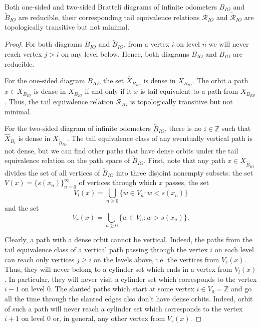 \documentclass[10pt,a4paper]{amsart}
\def\tl{\widetilde}
\def\wh{\widehat}
\newcommand{\Z}{\mathbb Z}
\begin{document}
\begin{prop}
Both one-sided and two-sided Bratteli diagrams of infinite odometers $B_{IO}$ and $\tl B_{IO}$ are reducible, their corresponding tail equivalence relations $\mathcal{R}_{IO}$ and $\widetilde{\mathcal{R}}_{IO}$ are topologically transitive but not minimal. 
\end{prop}

\begin{proof}
For both diagrams $B_{IO}$ and $\tl B_{IO}$, from a vertex $i$ on level $n$ we will never reach vertex $j > i$ on any level below. Hence, both diagrams $B_{IO}$ and $\tl B_{IO}$ are reducible.

For the one-sided diagram $B_{IO}$, 
the set $\wh{X}_{B_{RS}}$ is dense in $X_{B_{IO}}$. The orbit a path $x \in X_{B_{IO}}$ is dense in $X_{B_{IO}}$ if and only if it $x$ is tail equivalent to a path from $X_{B_{RS}}$. Thus, the tail equivalence relation $\mathcal{R}_{IO}$ is topologically transitive but not minimal.


For the two-sided diagram of infinite odometers $\tl B_{IO}$, there is no $i \in \Z$ such that $\wh{X}_{B_i}$ is dense in $X_{\tl B_{IO}}$. The tail equivalence class of any eventually vertical path is not dense, but we can find other paths that have dense orbits under the tail equivalence relation on the path space of $\tl B_{IO}$. 
First, note that any path $x \in X_{\tl B_{IO}}$ divides the set of all vertices of $\tl B_{IO}$ into three disjoint nonempty subsets: the set $V(x) = \{s(x_n)\}_{n = 0}^{\infty}$ of vertices through which $x$ passes, the set 
$$V_{l}(x) = \bigcup_{n \geq 0}\{w \in V_n : w < s(x_n)\}$$ 
and the set 
$$V_{r}(x) = \bigcup_{n \geq 0}\{w \in V_n : w > s(x_n)\}.$$ 

Clearly, a path with a dense orbit cannot be vertical. Indeed, the paths from the tail equivalence class of a vertical path passing through the vertex $i$ on each level can reach only vertices $j \geq i$ on the levels above, i.e. the vertices from $V_r(x)$. Thus, they will never belong to a cylinder set which ends in a vertex from $V_l(x)$. In particular, they will never visit a cylinder set which corresponds to the vertex $i - 1$ on level $0$. 
     The slanted paths which start at some vertex $i \in V_0 = \Z$ and go all the time through the slanted edges also don't have dense orbits. Indeed, orbit of such a path will never reach a cylinder set which corresponds to the vertex $i+1$ on level $0$ or, in general, any other vertex from $V_r(x)$.
     

\end{proof}
\end{document}
